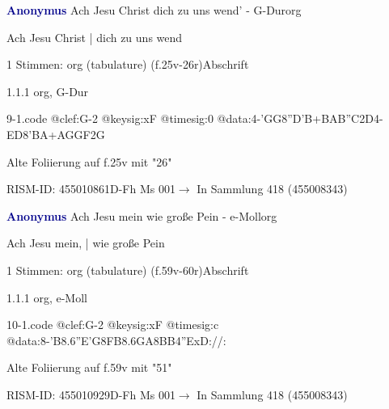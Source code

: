 \documentclass[twocolumn, 12pt]{book}
\begin{document}
\par \vspace{16pt} \textcolor{darkblue}{\textbf{Anonymus  }}\hfillplus{\textbf{[9]}}\newline Ach Jesu Christ dich zu uns wend' - G-Dur\newline org
\par \begin{itshape}[f.25v, at left:] Ach Jesu Christ | dich zu uns wend\end{itshape} 
\par \textcolor{darkblue}{}  1 Stimmen: org (tabulature)  (f.25v-26r)\newline Abschrift
\par 1.1.1  org, G-Dur  
\begin{filecontents*}{9-1.code}
@clef:G-2
@keysig:xF
@timesig:0
@data:4-'GG{8''D'B+}{BAB''C}2D4-ED{8'BA+}{AGGF}2G
\end{filecontents*}
\newline %
\par Alte Foliierung auf f.25v mit "26"
\par RISM-ID: 455010861\newline D-Fh  Ms 001\newline $\rightarrow$ In Sammlung 418 (455008343)
      
\par \vspace{16pt} \textcolor{darkblue}{\textbf{Anonymus  }}\hfillplus{\textbf{[10]}}\newline Ach Jesu mein wie große Pein - e-Moll\newline org
\par \begin{itshape}[f.59v, at left:] Ach Jesu mein, | wie große Pein\end{itshape} 
\par \textcolor{darkblue}{}  1 Stimmen: org (tabulature)  (f.59v-60r)\newline Abschrift
\par 1.1.1  org, e-Moll  
\begin{filecontents*}{10-1.code}
@clef:G-2
@keysig:xF
@timesig:c
@data:8-{'B8.6''E'G}{8FB8.6GA}{8BB}4''ExD://:
\end{filecontents*}
\newline %
\par Alte Foliierung auf f.59v mit "51"
\par RISM-ID: 455010929\newline D-Fh  Ms 001\newline $\rightarrow$ In Sammlung 418 (455008343)
      
\end{document}
